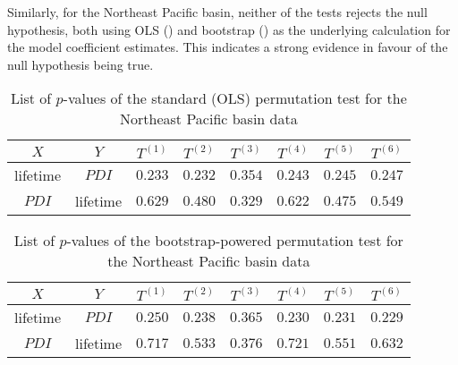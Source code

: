 Similarly, for the Northeast Pacific basin, neither of the tests rejects the null hypothesis, both using OLS () and bootstrap () as the underlying calculation for the model coefficient estimates. This indicates a strong evidence in favour of the null hypothesis being true.
\begin{table}[H]
	\centering
	\begin{tabular}{cccccccc}
	\toprule
	\toprule
	$X$  & $Y$       & $T^{(1)}$ & $T^{(2)}$ & $T^{(3)}$ & $T^{(4)}$ & $T^{(5)}$ & $T^{(6)}$ \\
	\midrule
	lifetime & $PDI$ & $0.233$ & $0.232$ & $0.354$ & $0.243$ & $0.245$ & $0.247$ \\
	$PDI$ & lifetime & $0.629$ & $0.480$ & $0.329$ & $0.622$ & $0.475$ & $0.549$ \\
	\bottomrule
	\end{tabular}
	\caption{List of $p$-values of the standard (OLS) permutation test for the Northeast Pacific basin data}
	\label{tab:perm-epac-ols-p-vals}
\end{table}

\begin{table}[H]
	\centering
	\begin{tabular}{cccccccc}
	\toprule
	\toprule
	$X$  & $Y$       & $T^{(1)}$ & $T^{(2)}$ & $T^{(3)}$ & $T^{(4)}$ & $T^{(5)}$ & $T^{(6)}$ \\
	\midrule
	lifetime & $PDI$ & $0.250$ & $0.238$ & $0.365$ & $0.230$ & $0.231$ & $0.229$ \\
	$PDI$ & lifetime & $0.717$ & $0.533$ & $0.376$ & $0.721$ & $0.551$ & $0.632$ \\
	\bottomrule
	\end{tabular}
	\caption{List of $p$-values of the bootstrap-powered permutation test for the Northeast Pacific basin data}
	\label{tab:perm-epac-boot-p-vals}
\end{table}
